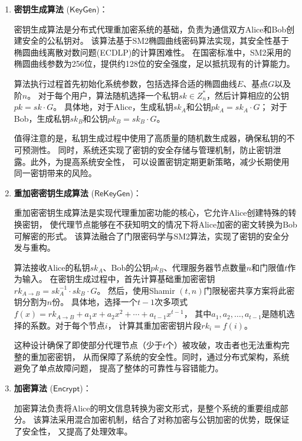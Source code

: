 \begin{enumerate}
	\item \textbf{密钥生成算法} ($\mathsf{KeyGen}$)：

	      密钥生成算法是分布式代理重加密系统的基础，负责为通信双方Alice和Bob创建安全的公私钥对。
	      该算法基于SM2椭圆曲线密码算法实现，其安全性基于椭圆曲线离散对数问题(ECDLP)的计算困难性。
	      在国密标准中，SM2采用的椭圆曲线参数为256位，提供约128位的安全强度，足以抵抗现有的计算能力。

	      算法执行过程首先初始化系统参数，包括选择合适的椭圆曲线$E$、基点$G$以及阶$n$。
	      对于每个用户，算法随机选择一个私钥$sk \in Z_n^*$，然后计算相应的公钥$pk = sk \cdot G$。
	      具体地，对于Alice，生成私钥$sk_A$和公钥$pk_A = sk_A \cdot G$；
	      对于Bob，生成私钥$sk_B$和公钥$pk_B = sk_B \cdot G$。

	      值得注意的是，私钥生成过程中使用了高质量的随机数生成器，确保私钥的不可预测性。
	      同时，系统还实现了密钥的安全存储与管理机制，防止密钥泄露。此外，为提高系统安全性，
	      可以设置密钥定期更新策略，减少长期使用同一密钥带来的风险。

	\item \textbf{重加密密钥生成算法} ($\mathsf{ReKeyGen}$)：

	      重加密密钥生成算法是实现代理重加密功能的核心，它允许Alice创建特殊的转换密钥，
	      使代理节点能够在不获知明文的情况下将Alice加密的密文转换为Bob可解密的形式。
	      该算法融合了门限密码学与SM2算法，实现了密钥的安全分发与重构。

	      算法接收Alice的私钥$sk_A$、Bob的公钥$pk_B$、代理服务器节点数量$n$和门限值$t$作为输入。
	      在密钥生成过程中，首先计算基础重加密密钥$rk_{A \rightarrow B} = sk_A^{-1} \cdot sk_B \cdot G$。
	      然后，使用Shamir $(t,n)$门限秘密共享方案将此密钥分割为$n$份。
	      具体地，选择一个$t-1$次多项式$f(x) = rk_{A \rightarrow B} + a_1x + a_2x^2 + \cdots + a_{t-1}x^{t-1}$，
	      其中$a_1, a_2, \ldots, a_{t-1}$是随机选择的系数。对于每个节点$i$，
	      计算其重加密密钥片段$rk_i = f(i)$。

	      这种设计确保了即使部分代理节点（少于$t$个）被攻破，攻击者也无法重构完整的重加密密钥，
	      从而保障了系统的安全性。同时，通过分布式架构，系统避免了单点故障问题，
	      提高了整体的可靠性与容错能力。

	\item \textbf{加密算法} ($\mathsf{Encrypt}$)：

	      加密算法负责将Alice的明文信息转换为密文形式，是整个系统的重要组成部分。
	      该算法采用混合加密机制，结合了对称加密与公钥加密的优势，既保证了安全性，
	      又提高了处理效率。


\end{enumerate}
